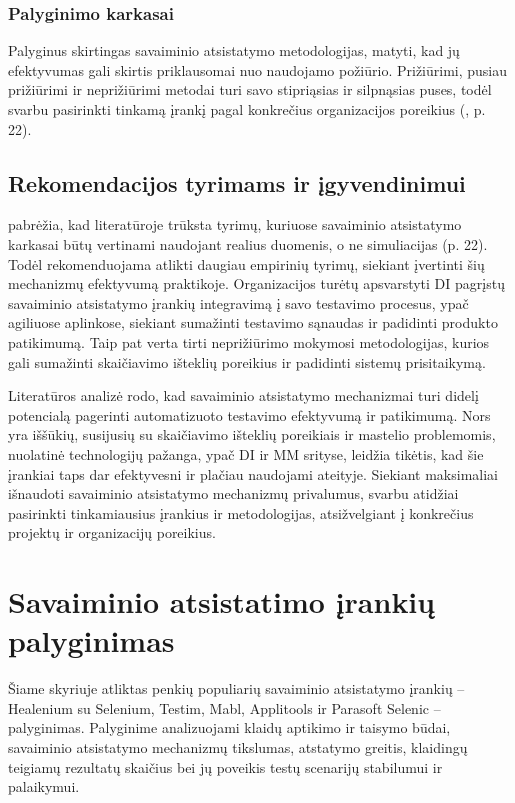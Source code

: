 \documentclass[
]{VUMIFPSkursinis}
\begin{document}
\subsubsection{Palyginimo karkasai}
Palyginus skirtingas savaiminio atsistatymo metodologijas, matyti, kad jų efektyvumas gali skirtis priklausomai nuo naudojamo požiūrio. Prižiūrimi, pusiau prižiūrimi ir neprižiūrimi metodai turi savo stipriąsias ir silpnąsias puses, todėl svarbu pasirinkti tinkamą įrankį pagal konkrečius organizacijos poreikius (\cite{Schneider2013}, p. 22).

\subsection{Rekomendacijos tyrimams ir įgyvendinimui}

\cite{Schneider2013} pabrėžia, kad literatūroje trūksta tyrimų, kuriuose savaiminio atsistatymo karkasai būtų vertinami naudojant realius duomenis, o ne simuliacijas (p. 22). Todėl rekomenduojama atlikti daugiau empirinių tyrimų, siekiant įvertinti šių mechanizmų efektyvumą praktikoje. Organizacijos turėtų apsvarstyti DI pagrįstų savaiminio atsistatymo įrankių integravimą į savo testavimo procesus, ypač agiliuose aplinkose, siekiant sumažinti testavimo sąnaudas ir padidinti produkto patikimumą. Taip pat verta tirti neprižiūrimo mokymosi metodologijas, kurios gali sumažinti skaičiavimo išteklių poreikius ir padidinti sistemų prisitaikymą.

Literatūros analizė rodo, kad savaiminio atsistatymo mechanizmai turi didelį potencialą pagerinti automatizuoto testavimo efektyvumą ir patikimumą. Nors yra iššūkių, susijusių su skaičiavimo išteklių poreikiais ir mastelio problemomis, nuolatinė technologijų pažanga, ypač DI ir MM srityse, leidžia tikėtis, kad šie įrankiai taps dar efektyvesni ir plačiau naudojami ateityje. Siekiant maksimaliai išnaudoti savaiminio atsistatymo mechanizmų privalumus, svarbu atidžiai pasirinkti tinkamiausius įrankius ir metodologijas, atsižvelgiant į konkrečius projektų ir organizacijų poreikius.

\section{Savaiminio atsistatimo įrankių palyginimas}

Šiame skyriuje atliktas penkių populiarių savaiminio atsistatymo įrankių – Healenium su Selenium, Testim, Mabl, Applitools ir Parasoft Selenic – palyginimas. Palyginime analizuojami klaidų aptikimo ir taisymo būdai, savaiminio atsistatymo mechanizmų tikslumas, atstatymo greitis, klaidingų teigiamų rezultatų skaičius bei jų poveikis testų scenarijų stabilumui ir palaikymui.
\end{document}
